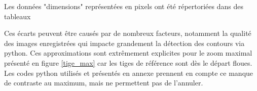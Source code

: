 \documentclass[11pt,letterpaper]{article}
\begin{document}
Les données "dimensions" représentées en pixels ont été répertoriées dans des tableaux

\begin{table}[h!]
\centering
{}
\caption{Tableau du nombre de pixels en fonction des tiges de référence pour le zoom minimum.}
\label{tige_min}
\end{table}

\begin{table}[h!]
\centering
{}
\caption{Tableau du nombre de pixels en fonction des tiges de référence pour le zoom maximum.}
\label{tige_max}

Ces écarts peuvent être causés par de nombreux facteurs, notamment la qualité des images enregistrées qui impacte grandement la détection des contours via python. Ces approximations sont extrêmement explicites pour le zoom maximal présenté en figure \ref{tige_max} car les tiges de référence sont dès le départ floues. Les codes python utilisés et présentés en annexe prennent en compte ce manque de contraste au maximum, mais ne permettent pas de l'annuler.

\end{table}
\end{document}
